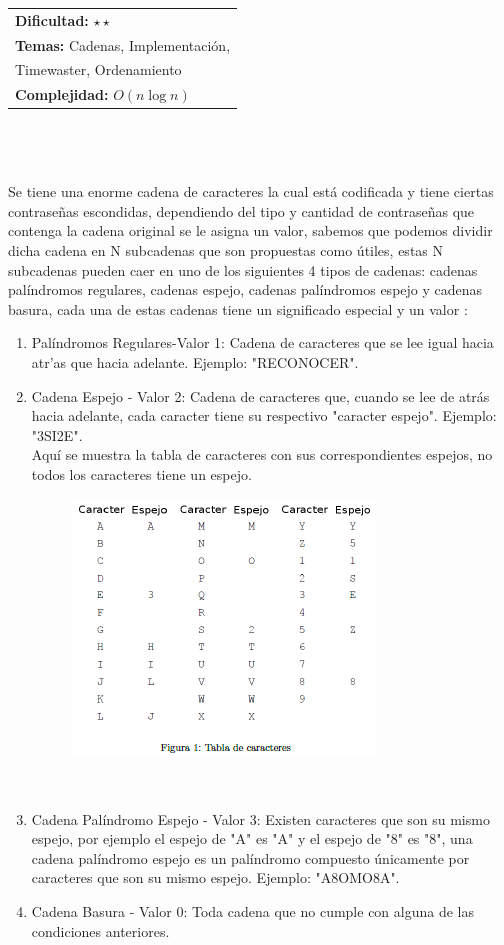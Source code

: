 \documentclass[12pt]{article}
\begin{document}
\hfill
\begin{tabular}{@{}l@{}}
\textbf{Dificultad:} $\star \star$ \\
\textbf{Temas:} Cadenas, Implementación,\\
Timewaster, Ordenamiento \\
\textbf{Complejidad:} $O(n \log n)$
\end{tabular}\\
\\
\\Se tiene una enorme cadena de caracteres la cual est\'a codificada y tiene ciertas contraseñas escondidas, dependiendo
del tipo y cantidad de contraseñas que contenga la cadena original se le asigna un valor, sabemos que
podemos dividir dicha cadena en $\mathrm{N}$ subcadenas que son propuestas como \'utiles, estas $\mathrm{N}$ subcadenas pueden caer
en uno de los siguientes 4 tipos de cadenas: cadenas pal\'indromos regulares, cadenas espejo, cadenas pal\'indromos
espejo y cadenas basura, cada una de estas cadenas tiene un significado especial y un valor :
\\ 
\begin{enumerate}
\item Pal\'indromos Regulares-Valor 1:
Cadena de caracteres que se lee igual hacia atr'as que hacia adelante. Ejemplo: "RECONOCER".
\item Cadena Espejo - Valor 2:
Cadena de caracteres que, cuando se lee de atr\'as hacia adelante, cada caracter tiene su respectivo "caracter
espejo". Ejemplo: "3SI2E".\\
Aqu\'i se muestra la tabla de caracteres con sus correspondientes espejos, no todos los caracteres tiene un
espejo.
\begin{figure}[h!] 
\begin{center} 
\includegraphics[scale = 1.0]{i3.PNG}\hspace{50mm}  
\end{center} 
\end{figure}
\\
\item Cadena Pal\'indromo Espejo - Valor 3:
Existen caracteres que son su mismo espejo, por ejemplo el espejo de "A" es "A" y el espejo de "8" es "8", una
cadena pal\'indromo espejo es un pal\'indromo compuesto \'unicamente por caracteres que son su mismo espejo.
Ejemplo: "A8OMO8A".
\item Cadena Basura - Valor 0:
Toda cadena que no cumple con alguna de las condiciones anteriores.\\
\end{enumerate}
\end{document}
